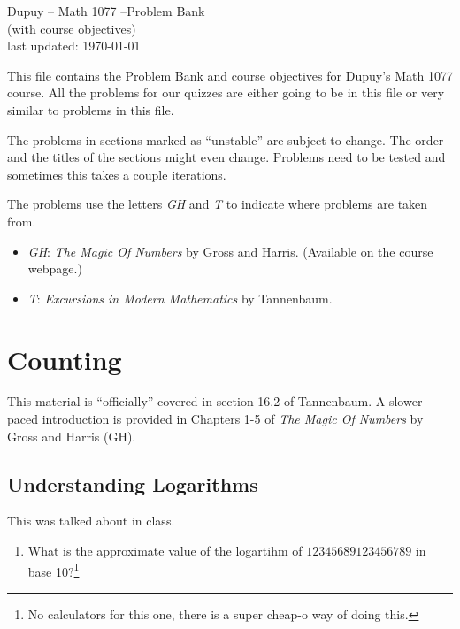 \documentclass[11pt, letterpaper]{article}
\begin{document}
 

\begin{center}
{\Large \sc Dupuy -- Math 1077  --Problem Bank\\ (with course objectives)}\\
last updated: \today
\end{center}

This file contains the Problem Bank and course objectives for Dupuy's Math 1077 course. 
All the problems for our quizzes are either going to be in this file or very similar to problems in this file.
\\

\vspace{1em} 

 The problems in sections marked as ``unstable'' are subject to change.
The order and the titles of the sections might even change. 
Problems need to be tested and sometimes this takes a couple iterations. 

\vspace{1 em}

 The problems use the letters \emph{GH} and \emph{T} to indicate where problems are taken from.
\begin{itemize}
	\item \emph{GH}: \emph{The Magic Of Numbers} by Gross and Harris. (Available on the course webpage.)
	\item \emph{T}: \emph{Excursions in Modern Mathematics} by Tannenbaum.
\end{itemize}

\tableofcontents

\newpage

\section{Counting}
This material is ``officially'' covered in section 16.2 of Tannenbaum. 
A slower paced introduction is provided in Chapters 1-5 of \emph{The Magic Of Numbers} by Gross and Harris (GH).

\subsection{Understanding Logarithms}
This was talked about in class.
\begin{enumerate}
	\item What is the approximate value of the logartihm of $12345689123456789$ in base 10?\footnote{No calculators for this one, there is a super cheap-o way of doing this.}
\end{enumerate}
\end{document}
